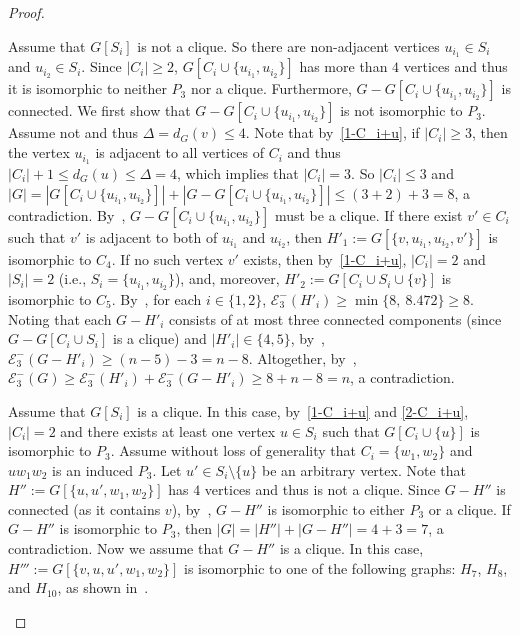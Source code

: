 \documentclass[a4paper,12pt]{article}
\theoremstyle{plain}
\newenvironment{proof*}{\noindent \emph{Proof of the claim.}}{\hfill$\Diamond$}
\begin{document}
\begin{proof}
\begin{proof*}
Assume that $G[S_i]$ is not a clique. So there are non-adjacent vertices $u_{i_1}\in S_i$ and $u_{i_2}\in S_i$. Since $|C_i|\geq 2$, $G[C_i\cup\{u_{i_1}, u_{i_2}\}]$ has more than $4$ vertices and thus it is isomorphic to neither $P_3$ nor a clique. Furthermore, $G-G[C_i\cup\{u_{i_1}, u_{i_2}\}]$ is connected. We first show that $G-G[C_i\cup\{u_{i_1}, u_{i_2}\}]$ is not isomorphic to $P_3$. Assume not and thus $\Delta=d_G(v)\leq 4$. Note that by~\ref{1-C_i+u}, if $|C_i|\geq 3$, then the vertex $u_{i_1}$ is adjacent to all vertices of $C_i$ and thus $|C_i|+1\leq d_G(u)\leq \Delta=4$, which implies that $|C_i|=3$. So $|C_i|\leq 3$ and $|G|= |G[C_i\cup\{u_{i_1}, u_{i_2}\}]|+|G-G[C_i\cup\{u_{i_1}, u_{i_2}\}]|\leq (3+2)+3=8$, a contradiction.  By~, $G-G[C_i\cup\{u_{i_1}, u_{i_2}\}]$ must be a clique. If there exist $v'\in C_i$ such that $v'$ is adjacent to both of $u_{i_1}$ and $u_{i_2}$, then $H'_1:=G[\{v,u_{i_1},u_{i_2},v'\}]$ is isomorphic to $C_4$. If no such vertex $v'$ exists, then by~\ref{1-C_i+u}, $|C_i|=2$ and $|S_i|=2$ (i.e., $S_i=\{u_{i_1}, u_{i_2}\}$), and, moreover, $H'_2:=G[C_i\cup S_i\cup \{v\}]$ is isomorphic to $C_5$. 
By~, for each $i\in \{1,2\}$, $\mathcal{E}_3^{-}(H'_i)\geq \min\{8,~8.472 \}\geq 8$. 
Noting that each $G-H'_i$ consists of at most three connected components (since $G-G[C_i\cup S_i]$ is a clique) and $|H'_i|\in \{4,5\}$, by~, $\mathcal{E}_3^{-}(G-H'_i)\geq (n-5)-3=n-8$. Altogether, by~, $\mathcal{E}_3^{-}(G)\geq\mathcal{E}_3^{-}(H'_i)+\mathcal{E}_3^{-}(G-H'_i)\geq 8+n-8=n$, a contradiction.


Assume that $G[S_i]$ is a clique. In this case, by~\ref{1-C_i+u} and \ref{2-C_i+u}, $|C_i|=2$ and there exists at least one vertex $u\in S_i$ such that $G[C_i\cup \{u\}]$ is isomorphic to $P_3$. Assume without loss of generality that $C_i=\{w_1, w_2\}$ and $uw_1w_2$ is an induced $P_3$. Let $u'\in S_i\setminus \{u\}$ be an arbitrary vertex. Note that $H'':=G[\{u,u',w_1,w_2\}]$ has $4$ vertices and thus is not a clique. Since $G-H''$ is connected (as it contains $v$), by~, $G-H''$ is isomorphic to either $P_3$ or a clique. If $G-H''$ is isomorphic to $P_3$, then $|G|=|H''|+|G-H''|=4+3=7$, a contradiction. Now we assume that $G-H''$ is a clique. In this case, $H''':=G[\{v,u,u',w_1,w_2\}]$ is isomorphic to one of the following graphs: $H_7$, $H_8$, and $H_{10}$, as shown in~.
\begin{figure}[htbp]
\centering
\begin{subfigure}[t]{.32\textwidth}
\centering
{}
\end{subfigure}
\end{figure}
\end{proof*}
\end{proof}
\end{document}

